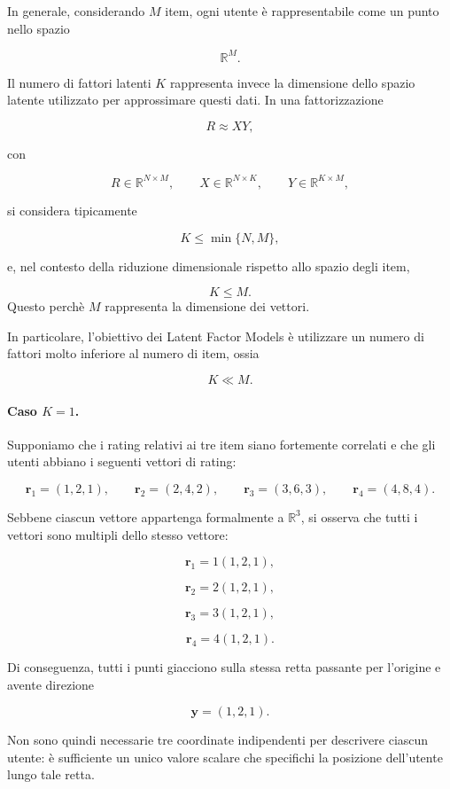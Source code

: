In generale, considerando \(M\) item, ogni utente è rappresentabile come un punto nello spazio

\[
\mathbb{R}^{M}.
\]

Il numero di fattori latenti \(K\) rappresenta invece la dimensione dello spazio latente utilizzato per approssimare questi dati. In una fattorizzazione

\[
R \approx XY,
\]

con

\[
R\in\mathbb{R}^{N\times M},
\qquad
X\in\mathbb{R}^{N\times K},
\qquad
Y\in\mathbb{R}^{K\times M},
\]

si considera tipicamente

\[
K \leq \min\{N,M\},
\]

e, nel contesto della riduzione dimensionale rispetto allo spazio degli item,

\[
K \leq M.
\]
Questo perchè $M$ rappresenta la dimensione dei vettori.


In particolare, l'obiettivo dei Latent Factor Models è utilizzare un numero di fattori molto inferiore al numero di item, ossia

\[
K \ll M.
\]

\paragraph{Caso \(K=1\).}

Supponiamo che i rating relativi ai tre item siano fortemente correlati e che gli utenti abbiano i seguenti vettori di rating:

\[
\mathbf{r}_1=(1,2,1),
\qquad
\mathbf{r}_2=(2,4,2),
\qquad
\mathbf{r}_3=(3,6,3),
\qquad
\mathbf{r}_4=(4,8,4).
\]

Sebbene ciascun vettore appartenga formalmente a \(\mathbb{R}^{3}\), si osserva che tutti i vettori sono multipli dello stesso vettore:

\[
\mathbf{r}_1 = 1(1,2,1),
\]

\[
\mathbf{r}_2 = 2(1,2,1),
\]

\[
\mathbf{r}_3 = 3(1,2,1),
\]

\[
\mathbf{r}_4 = 4(1,2,1).
\]

Di conseguenza, tutti i punti giacciono sulla stessa retta passante per l'origine e avente direzione

\[
\mathbf{y}=(1,2,1).
\]

Non sono quindi necessarie tre coordinate indipendenti per descrivere ciascun utente: è sufficiente un unico valore scalare che specifichi la posizione dell'utente lungo tale retta.

